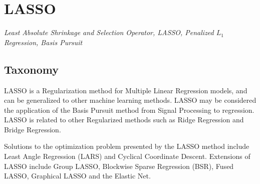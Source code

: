 
\section{LASSO} 
\label{sec:lasso}

\emph{Least Absolute Shrinkage and Selection Operator, LASSO, Penalized $L_1$ Regression, Basis Pursuit}

\subsection{Taxonomy}
LASSO is a Regularization method for Multiple Linear Regression models, and can be generalized to other machine learning methods.
LASSO may be considered the application of the Basis Pursuit method from Signal Processing to regression.
LASSO is related to other Regularized methods such as Ridge Regression and Bridge Regression.

Solutions to the optimization problem presented by the LASSO method include Least Angle Regression (LARS) and Cyclical Coordinate Descent.
Extensions of LASSO include Group LASSO, Blockwise Sparse Regression (BSR), Fused LASSO, Graphical LASSO and the Elastic Net.

